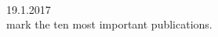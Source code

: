 \documentclass[12pt,a4]{report}
\begin{document}
\newcommand{\emp}[1]
{\it{#1}\rm}

\newenvironment{Body} %
 {\begin{list}{}{%
	\vspace{-0.6cm}
	\setlength{\leftmargin}{1.2cm}}
	  \item[]\ignorespaces}
 {\end{list}}


\vspace{-2cm}


 \\

 \hfill 19.1.2017\\


%
 mark the ten most important publications.
\vspace{0.3cm}


%

\vspace{0.3cm}





\vspace{0.4cm}

\end{document}
